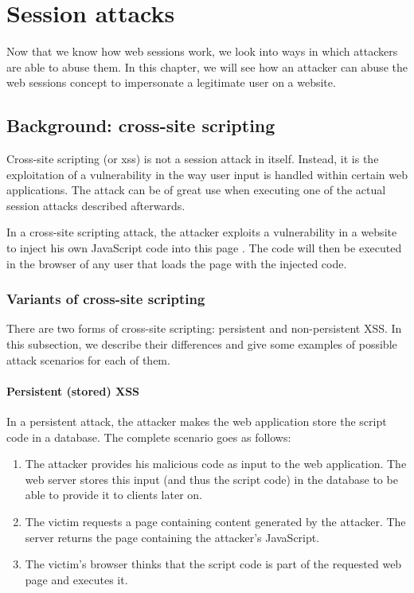 \chapter{Session attacks}\label{attacks}

Now that we know how web sessions work, we look into ways in which attackers are able to abuse them. In this chapter, we will see how an attacker can abuse the web sessions concept to impersonate a legitimate user on a website.

\section{Background: cross-site scripting}\label{xss}

Cross-site scripting (or \gls{xss}) is not a session attack in itself. Instead, it is the exploitation of a vulnerability in the way user input is handled within certain web applications. The attack can be of great use when executing one of the actual session attacks described afterwards.

In a cross-site scripting attack, the attacker exploits a vulnerability in a website to inject his own JavaScript code into this page \cite{DiLucca2005}. The code will then be executed in the browser of any user that loads the page with the injected code.

\subsection{Variants of cross-site scripting}
There are two forms of cross-site scripting: persistent and non-persistent XSS. In this subsection, we describe their differences and give some examples of possible attack scenarios for each of them.

\subsubsection{Persistent (stored) XSS}
In a persistent attack, the attacker makes the web application store the script code in a database. The complete scenario goes as follows:

\begin{enumerate}
	\item The attacker provides his malicious code as input to the web application.  The web server stores this input (and thus the script code) in the database to be able to provide it to clients later on.
	\item The victim requests a page containing content generated by the attacker. The server returns the page containing the attacker's JavaScript.
	\item The victim's browser thinks that the script code is part of the requested web page and executes it.
\end{enumerate}

